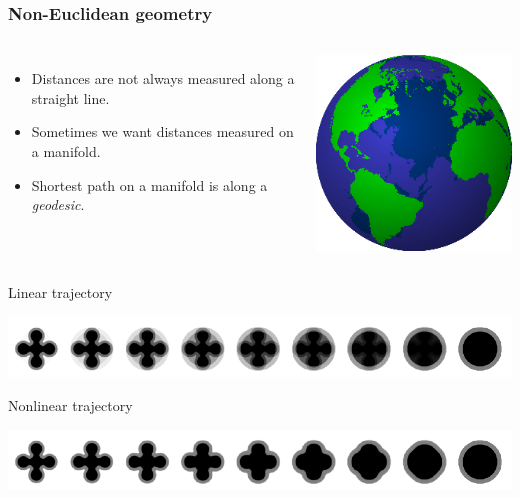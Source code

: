 \begin{frame}
\frametitle{Non-Euclidean geometry}
\begin{columns}[c]
\begin{itemize}
\item Distances are not always measured along a straight line.\par
\item Sometimes we want distances measured on a manifold.\par
\item Shortest path on a manifold is along a \emph{geodesic}.
\end{itemize}
\includegraphics[width=\textwidth]{Globe}
\end{columns}
Linear trajectory\par
\includegraphics[width=\textwidth]{series1}\par
Nonlinear trajectory\par
\includegraphics[width=\textwidth]{series2}\par
\end{frame}

